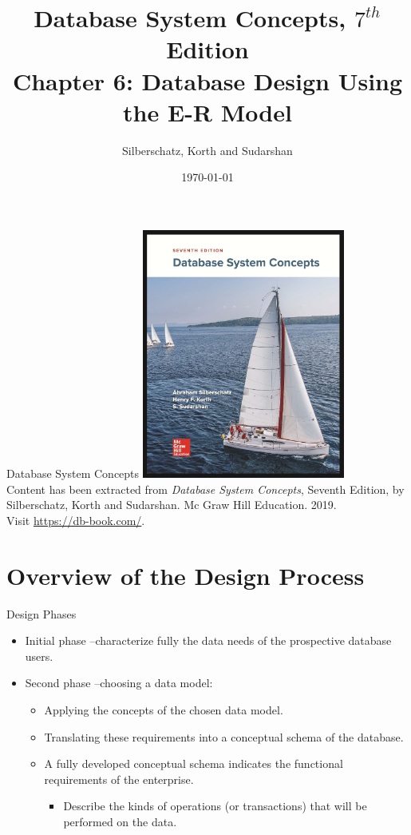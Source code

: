 \documentclass{beamer}
\title[Chapter 6: E-R Models]{Database System Concepts, $7^{th}$ Edition \\ Chapter 6: Database Design Using the E-R Model}
\author{Silberschatz, Korth and Sudarshan}
\date{\today}
\begin{document}
\frame{\titlepage}

\begin{frame}{Database System Concepts}
    \centering
    \includegraphics[width=0.5\textwidth]{figures/book_cover.jpg} \\
    \vspace{5mm}
    {
        \tiny
        Content has been extracted from \textit{Database System Concepts}, Seventh Edition, by Silberschatz, Korth and Sudarshan. Mc Graw Hill Education. 2019.\\
        Visit \url{https://db-book.com/}.\\
    }
\end{frame}

\section{Overview of the Design Process}

\begin{frame}{Design Phases}
    \begin{itemize}
        \item Initial phase --characterize fully the data needs of the prospective database users.
        \item Second phase --choosing a data model:
        \begin{itemize}
            \item Applying the concepts of the chosen data model.
            \item Translating these requirements into a conceptual schema of the database.
            \item A fully developed conceptual schema indicates the functional requirements of the enterprise.
            \begin{itemize}
                \item Describe the kinds of operations (or transactions) that will be performed on the data.
            \end{itemize}
        \end{itemize}
    \end{itemize}
\end{frame}
\end{document}
